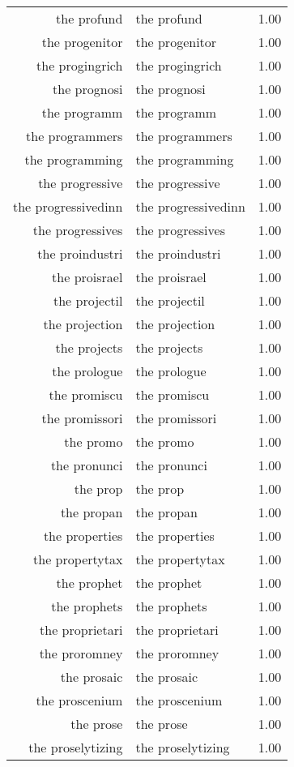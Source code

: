 \begin{table}[ht]
\begin{tabular}{rlr}
  the profund & the profund & 1.00 \\ 
  the progenitor & the progenitor & 1.00 \\ 
  the progingrich & the progingrich & 1.00 \\ 
  the prognosi & the prognosi & 1.00 \\ 
  the programm & the programm & 1.00 \\ 
  the programmers & the programmers & 1.00 \\ 
  the programming & the programming & 1.00 \\ 
  the progressive & the progressive & 1.00 \\ 
  the progressivedinn & the progressivedinn & 1.00 \\ 
  the progressives & the progressives & 1.00 \\ 
  the proindustri & the proindustri & 1.00 \\ 
  the proisrael & the proisrael & 1.00 \\ 
  the projectil & the projectil & 1.00 \\ 
  the projection & the projection & 1.00 \\ 
  the projects & the projects & 1.00 \\ 
  the prologue & the prologue & 1.00 \\ 
  the promiscu & the promiscu & 1.00 \\ 
  the promissori & the promissori & 1.00 \\ 
  the promo & the promo & 1.00 \\ 
  the pronunci & the pronunci & 1.00 \\ 
  the prop & the prop & 1.00 \\ 
  the propan & the propan & 1.00 \\ 
  the properties & the properties & 1.00 \\ 
  the propertytax & the propertytax & 1.00 \\ 
  the prophet & the prophet & 1.00 \\ 
  the prophets & the prophets & 1.00 \\ 
  the proprietari & the proprietari & 1.00 \\ 
  the proromney & the proromney & 1.00 \\ 
  the prosaic & the prosaic & 1.00 \\ 
  the proscenium & the proscenium & 1.00 \\ 
  the prose & the prose & 1.00 \\ 
  the proselytizing & the proselytizing & 1.00 \\ 

\end{tabular}
\end{table}
